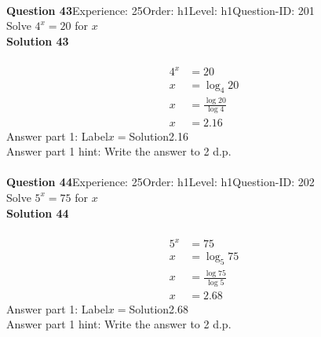 \documentclass{article}
\begin{document}
\\[4pt]
\noindent\textbf{Question 43}\hspace{20pt}Experience: 25\hspace{20pt}Order: h1\hspace{20pt}Level: h1\hspace{20pt}Question-ID: 201\\[2pt]
Solve $4^x=20$ for $x$\\[4pt]
\noindent\textbf{Solution 43}\\[2pt]
\\[-35pt]\begin{align*}
4^x&=20\\[2pt]
x&=\log_{4}20\\[2pt]
x&=\displaystyle\frac{\log20}{\log4}\\[2pt]
x&=2.16
\end{align*}
Answer part 1: \hspace{10pt}Label\hspace{10pt}$x=$\hspace{10pt}Solution\hspace{10pt}2.16\\
Answer part 1 hint: \hspace{15pt}Write the answer to 2 d.p.\\
\\[4pt]
\noindent\textbf{Question 44}\hspace{20pt}Experience: 25\hspace{20pt}Order: h1\hspace{20pt}Level: h1\hspace{20pt}Question-ID: 202\\[2pt]
Solve $5^x=75$ for $x$\\[4pt]
\noindent\textbf{Solution 44}\\[2pt]
\\[-35pt]\begin{align*}
5^x&=75\\[2pt]
x&=\log_{5}75\\[2pt]
x&=\displaystyle\frac{\log75}{\log5}\\[2pt]
x&=2.68
\end{align*}
Answer part 1: \hspace{10pt}Label\hspace{10pt}$x=$\hspace{10pt}Solution\hspace{10pt}2.68\\
Answer part 1 hint: \hspace{15pt}Write the answer to 2 d.p.\\
\end{document}
